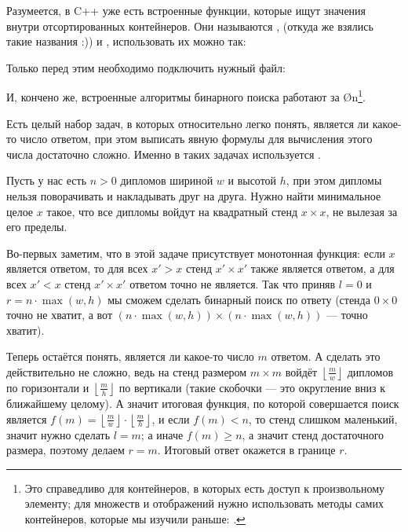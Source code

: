 Разумеется, в C++ уже есть встроенные функции, которые ищут значения внутри отсортированных контейнеров. Они называются ,  (откуда же взялись такие названия :)) и , использовать их можно так:


Только перед этим необходимо подключить нужный файл:


И, кончено же, встроенные алгоритмы бинарного поиска работают за \O{\log n}\footnote{Это справедливо для контейнеров, в которых есть доступ к произвольному элементу; для множеств и отображений нужно использовать методы самих контейнеров, которые мы изучили раньше: .}.

Есть целый набор задач, в которых относительно легко понять, является ли какое-то число ответом, при этом выписать явную формулы для вычисления этого числа достаточно сложно. Именно в таких задачах используется .

Пусть у нас есть $n > 0$ дипломов шириной $w$ и высотой $h$, при этом дипломы нельзя поворачивать и накладывать друг на друга. Нужно найти минимальное целое $x$ такое, что все дипломы войдут на квадратный стенд $x \times x$, не вылезая за его пределы.

Во-первых заметим, что в этой задаче присутствует монотонная функция: если $x$ является ответом, то для всех $x' > x$ стенд $x' \times x'$ также является ответом, а для всех $x' < x$ стенд $x' \times x'$ ответом точно не является. Так что приняв $l=0$ и $r=n \cdot \max(w, h)$ мы сможем сделать бинарный поиск по ответу (стенда $0 \times 0$ точно не хватит, а вот $(n \cdot \max(w, h)) \times (n \cdot \max(w, h))$ — точно хватит).

Теперь остаётся понять, является ли какое-то число $m$ ответом. А сделать это действительно не сложно, ведь на стенд размером $m \times m$ войдёт $\left\lfloor \frac{m}{w} \right\rfloor$ дипломов по горизонтали и $\left\lfloor \frac{m}{h} \right\rfloor$ по вертикали (такие скобочки — это округление вниз к ближайшему целому). А значит итоговая функция, по которой совершается поиск является $f(m) = \left\lfloor \frac{m}{w} \right\rfloor \cdot \left\lfloor \frac{m}{h} \right\rfloor$, и если $f(m) < n$, то стенд слишком маленький, значит нужно сделать $l = m$; а иначе $f(m) \geq n$, а значит стенд достаточного размера, поэтому делаем $r = m$. Итоговый ответ окажется в границе $r$.

